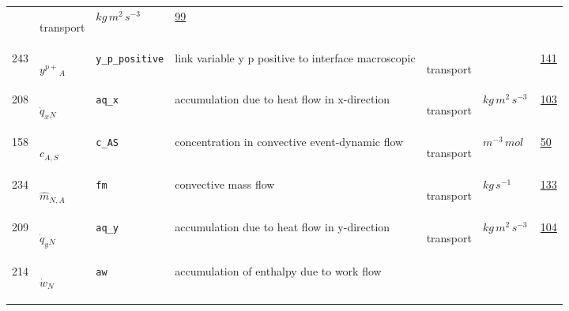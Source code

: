 \begin{longtable}{|p{1cm}|p{2.5cm}|p{4.5cm}|p{8cm}|p{3.0cm}|p{3cm}|p{1cm}|}
             & \begin{lay}transport \end{lay}
             & $ kg \,m^{2} \,s^{-3} \, $
             &                 \hyperlink{"e:99"}{ 99 }
                 \\
            243
             & \hypertarget{"v:243"}{ $ {{y^{p+}}}{_{A}} $}
             & \verb|y_p_positive|
             & link variable  y p positive to interface macroscopic
             & \begin{lay}transport \end{lay}
             & $  $
             &                 \hyperlink{"e:141"}{ 141 }
                 \\
            208
             & \hypertarget{"v:208"}{ $ {{\dot{q}_x}}{_{N}} $}
             & \verb|aq_x|
             & accumulation due to heat flow in x-direction
             & \begin{lay}transport \end{lay}
             & $ kg \,m^{2} \,s^{-3} \, $
             &                 \hyperlink{"e:103"}{ 103 }
                 \\
            158
             & \hypertarget{"v:158"}{ $ {c}{_{A, S}} $}
             & \verb|c_AS|
             & concentration in convective event-dynamic flow
             & \begin{lay}transport \end{lay}
             & $ m^{-3} \,mol \, $
             &                 \hyperlink{"e:50"}{ 50 }
                 \\
            234
             & \hypertarget{"v:234"}{ $ {{\hat{m}}}{_{N, A}} $}
             & \verb|fm|
             & convective mass flow
             & \begin{lay}transport \end{lay}
             & $ kg \,s^{-1} \, $
             &                 \hyperlink{"e:133"}{ 133 }
                 \\
            209
             & \hypertarget{"v:209"}{ $ {{\dot{q}_y}}{_{N}} $}
             & \verb|aq_y|
             & accumulation due to heat flow in y-direction
             & \begin{lay}transport \end{lay}
             & $ kg \,m^{2} \,s^{-3} \, $
             &                 \hyperlink{"e:104"}{ 104 }
                 \\
            214
             & \hypertarget{"v:214"}{ $ {{\dot{w}}}{_{N}} $}
             & \verb|aw|
             & accumulation of enthalpy due to work flow

\end{longtable}
